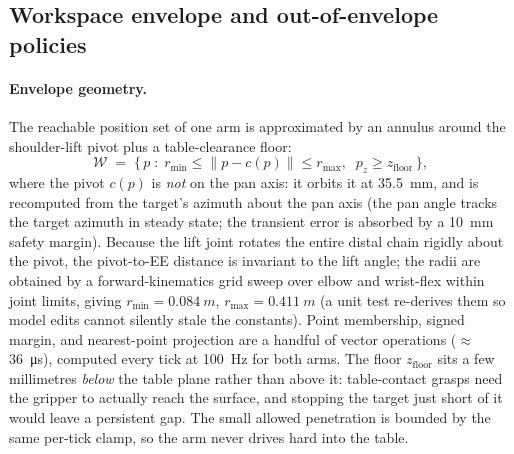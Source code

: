 \subsection{Workspace envelope and out-of-envelope policies}
\label{sec:envelope}

\paragraph{Envelope geometry.}
The reachable position set of one arm is approximated by an annulus
around the shoulder-lift pivot plus a table-clearance floor:
\begin{equation}
  \mathcal{W} \;=\; \bigl\{\,p \;:\; r_{\min}\le \lVert p - c(p)\rVert \le
  r_{\max}, \;\; p_z \ge z_{\mathrm{floor}} \,\bigr\},
  \label{eq:envelope}
\end{equation}
where the pivot \(c(p)\) is \emph{not} on the pan axis: it orbits it at
\SI{35.5}{mm}, and is recomputed from the target's azimuth about the pan
axis (the pan angle tracks the target azimuth in steady state; the
transient error is absorbed by a \SI{10}{mm} safety margin). Because the
lift joint rotates the entire distal chain rigidly about the pivot, the
pivot-to-EE distance is invariant to the lift angle; the radii are
obtained by a forward-kinematics grid sweep over elbow and wrist-flex
within joint limits, giving \(r_{\min}=\SI{0.084}{m}\),
\(r_{\max}=\SI{0.411}{m}\) (a unit test re-derives them so model edits
cannot silently stale the constants). Point membership, signed margin,
and nearest-point projection are a handful of vector operations
(\(\approx\)\SI{36}{\micro s}), computed every tick at \SI{100}{Hz} for
both arms. The floor \(z_{\mathrm{floor}}\) sits a few millimetres
\emph{below} the table plane rather than above it: table-contact grasps
need the gripper to actually reach the surface, and stopping the target
just short of it would leave a persistent gap. The small allowed
penetration is bounded by the same per-tick clamp, so the arm never
drives hard into the table.

